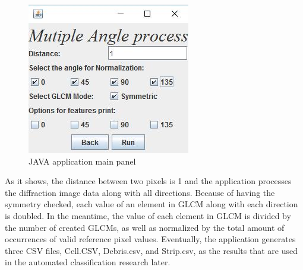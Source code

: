 \begin{figure}
\centering
\includegraphics{java_panel}
\caption{JAVA application main panel}
\end{figure}
As it shows, the distance between two pixels is 1 and the application processes the diffraction image data along with all directions. Because of having the symmetry checked, each value of an element in GLCM along with each direction is doubled. In the meantime, the value of each element in GLCM is divided by the number of created GLCMs, as well as normalized by the total amount of occurrences of valid reference pixel values. Eventually, the application generates three CSV files, Cell.CSV, Debris.csv, and Strip.csv, as the results that are used in the automated classification research later. 
